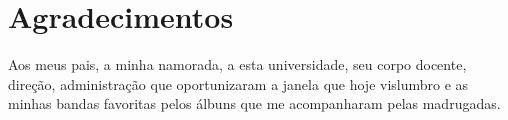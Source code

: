 \chapter*{Agradecimentos}

Aos meus pais, a minha namorada, a esta universidade, seu corpo docente, direção, administração que oportunizaram a janela que hoje vislumbro e as minhas bandas favoritas pelos álbuns que me acompanharam pelas madrugadas.